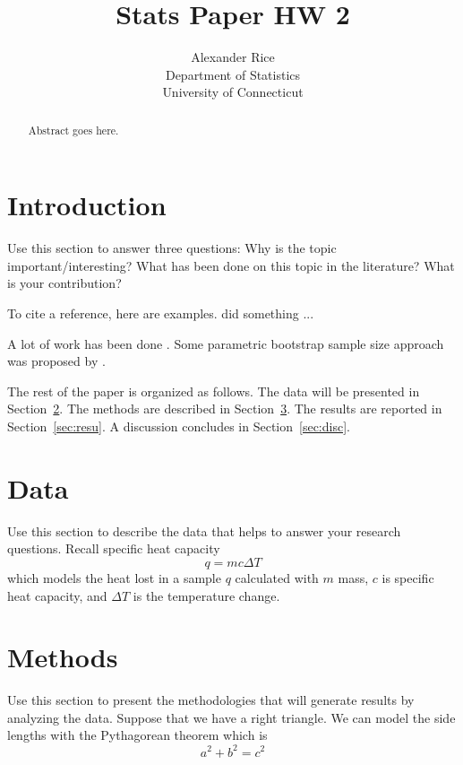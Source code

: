 \documentclass[12pt]{article}
\title{Stats Paper HW 2}
\author{Alexander Rice\\
  Department of Statistics\\
  University of Connecticut
}
\begin{document}
\maketitle

\begin{abstract}
Abstract goes here.  
\end{abstract}


\section{Introduction}
\label{sec:intro}

Use this section to answer three questions:
Why is the topic important/interesting?
What has been done on this topic in the literature?
What is your contribution?

\lipsum[1-3]

To cite a reference, here are examples.
\citet{Kim2019analysis} did something ... \lipsum[1]

A lot of work has been done \citep[e.g.,][]{Kim2019analysis}.
\lipsum[2]
Some parametric bootstrap sample size approach was proposed by
\citet{Villela2019analysis}. 


The rest of the paper is organized as follows.
The data will be presented in Section~\ref{sec:data}.
The methods are described in Section~\ref{sec:meth}.
The results are reported in Section~\ref{sec:resu}.
A discussion concludes in Section~\ref{sec:disc}.


\section{Data}
\label{sec:data}

Use this section to describe the data that helps to answer your research
questions. Recall specific heat capacity
\begin{equation}
  \label{eq:heat}
  q = mc\Delta T
\end{equation}
which models the heat lost in a sample $q$ calculated with $m$ mass, $c$ is specific heat capacity, and $\Delta T$ is the temperature change.

\section{Methods}
\label{sec:meth}

Use this section to present the methodologies that will generate results by
analyzing the data. Suppose that we have a right triangle. We can model the side lengths with the Pythagorean theorem which is
\begin{equation}
  \label{eq:area}
  a^2 + b^2 = c^2
\end{equation}
\end{document}

